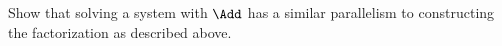   Show that solving a system with $\Add$ has a similar parallelism to
  constructing the factorization as described above.
